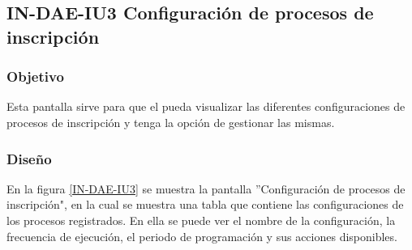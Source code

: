 \subsection{IN-DAE-IU3 Configuración de procesos de inscripción}

\subsubsection{Objetivo}
	
	Esta pantalla sirve para que el  pueda visualizar las diferentes configuraciones de procesos de inscripción y tenga la opción de gestionar las mismas.

\subsubsection{Diseño}

    En la figura \ref{IN-DAE-IU3} se muestra la pantalla ''Configuración de procesos de inscripción", en la cual se muestra una tabla que contiene las configuraciones de los procesos registrados. En ella se puede ver el nombre de la configuración, la frecuencia de ejecución, el periodo de programación y sus acciones disponibles.
    
    